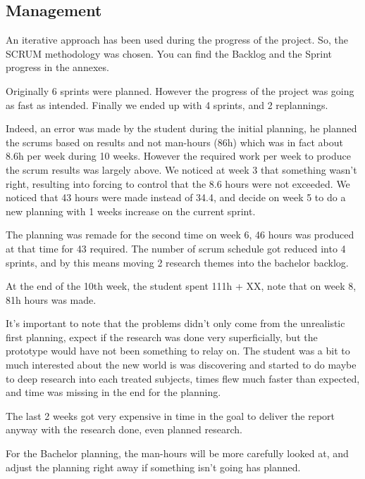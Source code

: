 
\subsection{Management}
An iterative approach has been used during the progress of the project. So, the SCRUM methodology was chosen. You can find the Backlog and the Sprint progress in the annexes.

Originally 6 sprints were planned. However the progress of the project was going as fast as intended. Finally we ended up with 4 sprints, and 2 replannings.

Indeed, an error was made by the student during the initial planning, he planned the scrums based on results and not man-hours (86h) which was in fact about 8.6h per week during 10 weeks. However the required work per week to produce the scrum results was largely above. We noticed at week 3 that something wasn't right, resulting into forcing to control that the 8.6 hours were not exceeded. We noticed that 43 hours were made instead of 34.4, and decide on week 5 to do a new planning with 1 weeks increase on the current sprint.

The planning was remade for the second time on week 6, 46 hours was produced at that time for 43 required. The number of scrum schedule got reduced into 4 sprints, and by this means moving 2 research themes into the bachelor backlog.

At the end of the 10th week, the student spent 111h + XX, note that on week 8, 81h hours was made.

It's important to note that the problems didn't only come from the unrealistic first planning, expect if the research was done very superficially, but the prototype would have not been something to relay on. The student was a bit to much interested about the new world is was discovering and started to do maybe to deep research into each treated subjects, times flew much faster than expected, and time was missing in the end for the planning.

The last 2 weeks got very expensive in time in the goal to deliver the report anyway with the research done, even planned research.

For the Bachelor planning, the man-hours will be more carefully looked at, and adjust the planning right away if something isn't going has planned.

